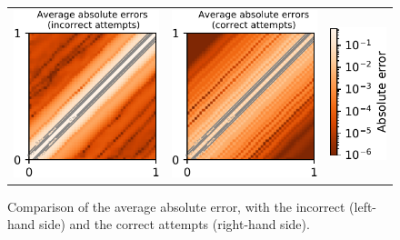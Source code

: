 \documentclass[12pt]{report} %
\begin{document}
\begin{figure}
  \hspace*{-1cm}
  \begin{tabular}{ccc}
    \includegraphics[width=.35\textwidth]{imagenes/experiments/2d/hyperbolic_1d/avg_absolute_error_True.pdf}&
    \includegraphics[width=.35\textwidth]{imagenes/experiments/2d/hyperbolic_1d/avg_absolute_error_False.pdf}&
    \includegraphics[width=.15\textwidth]{imagenes/experiments/2d/hyperbolic_1d/avg_absolute_error_caption.pdf}
\end{tabular}
\caption{Comparison of the average absolute error, with the incorrect (left-hand side) and the correct attempts (right-hand side).}
\label{fig:comparison-avg-absolute-errors-wave}
\end{figure}
\end{document}
